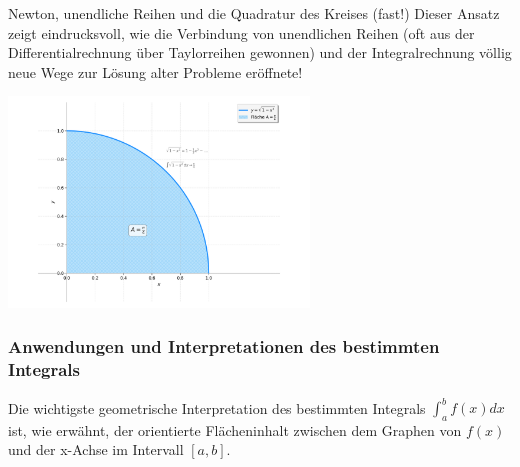 \begin{funfactbox}{Newton, unendliche Reihen und die Quadratur des Kreises (fast!)}
Dieser Ansatz zeigt eindrucksvoll, wie die Verbindung von unendlichen Reihen (oft aus der Differentialrechnung über Taylorreihen gewonnen) und der Integralrechnung völlig neue Wege zur Lösung alter Probleme eröffnete!

\begin{center}
    \includegraphics[width=0.6\textwidth]{grafiken/Newton_Pi_Integral.png}
    \label{fig:newton_pi_integral_funfact}
\end{center}
\end{funfactbox}

\subsubsection{Anwendungen und Interpretationen des bestimmten Integrals}

Die wichtigste geometrische Interpretation des bestimmten Integrals $\int_a^b f(x)dx$ ist, wie erwähnt, der orientierte Flächeninhalt zwischen dem Graphen von $f(x)$ und der x-Achse im Intervall $[a,b]$.

